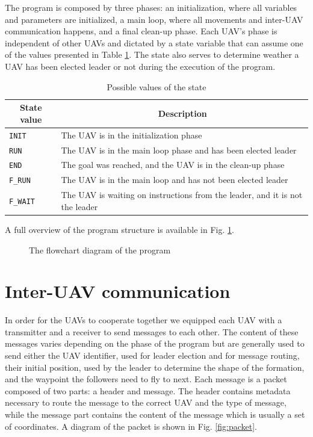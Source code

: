 The program is composed by three phases: an initialization, where all variables and parameters
are initialized, a main loop, where all movements and inter-UAV communication happens, and a 
final clean-up phase. Each UAV's phase is independent of other UAVs and dictated by a state 
variable that can assume one of the values presented in Table \ref{tab:states}. The state 
also serves to determine weather a UAV has been elected leader or not during the execution
of the program. 

\begin{table}
	\caption{Possible values of the state}\label{tab:states}
	\begin{center}
		\begin{tabular}[t]{l|l}
			\hline
			\multicolumn{1}{c|}{\textbf{State value}} & 
			\multicolumn{1}{c}{\textbf{Description}} \\
			\hline 
			\texttt{INIT} & The UAV is in the initialization phase \\
			\hline
			\texttt{RUN} & The UAV is in the main loop phase and has been elected leader \\
			\hline
			\texttt{END} & The goal was reached, and the UAV is in the clean-up phase \\
			\hline
			\texttt{F\_RUN} & The UAV is in the main loop and has not been elected leader \\
			\hline
			\texttt{F\_WAIT} & The UAV is waiting on instructions from the leader, and it is not the leader \\
			\hline
		\end{tabular}
	\end{center}
\end{table}

A full overview of the program structure is available in Fig. \ref{fig:flowchart}.

\begin{figure}
	\begin{center}
		
	\end{center}
	\caption{The flowchart diagram of the program}\label{fig:flowchart}
\end{figure}

\section{Inter-UAV communication}

In order for the UAVs to cooperate together we equipped each UAV with a transmitter and a 
receiver to send messages to each other. The content of these messages varies depending
on the phase of the program but are generally used to send either the UAV identifier, used
for leader election and for message routing, their initial position, used by the leader
to determine the shape of the formation, and the waypoint the followers need to fly to next. 
Each message is a packet composed of two parts: a header and message. The header contains
metadata necessary to route the message to the correct UAV and the type of message, while 
the message part contains the content of the message which is usually a set of coordinates. 
A diagram of the packet is shown in Fig. \ref{fig:packet}.

